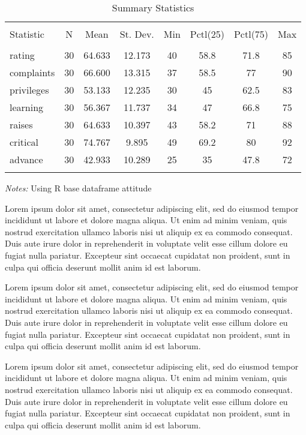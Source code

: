 \documentclass[11pt]{article}
\begin{document}
\begin{table}[tp] 
    \caption{Summary Statistics}
    \label{summ_stat}
    \centering 

    \begin{tabular}{lccccccc} 
        \hline 
        \hline \\[-1.8ex] 
        Statistic & N & Mean & St. Dev. & Min & Pctl(25) & Pctl(75) & Max\\ 
        \hline \\[-1.8ex] 
        rating & 30 & 64.633 & 12.173 & 40 & 58.8 & 71.8 & 85 \\ 
        complaints & 30 & 66.600 & 13.315 & 37 & 58.5 & 77 & 90 \\ 
        privileges & 30 & 53.133 & 12.235 & 30 & 45 & 62.5 & 83 \\ 
        learning & 30 & 56.367 & 11.737 & 34 & 47 & 66.8 & 75 \\ 
        raises & 30 & 64.633 & 10.397 & 43 & 58.2 & 71 & 88 \\ 
        critical & 30 & 74.767 & 9.895 & 49 & 69.2 & 80 & 92 \\ 
        advance & 30 & 42.933 & 10.289 & 25 & 35 & 47.8 & 72 \\ 
        \hline \\[-1.8ex] 
    \end{tabular} 
    
    \textit{Notes:} Using R base dataframe attitude \\ 
\end{table} 

Lorem ipsum dolor sit amet, consectetur adipiscing elit, sed do eiusmod tempor incididunt ut labore et dolore magna aliqua. Ut enim ad minim veniam, quis nostrud exercitation ullamco laboris nisi ut aliquip ex ea commodo consequat. Duis aute irure dolor in reprehenderit in voluptate velit esse cillum dolore eu fugiat nulla pariatur. Excepteur sint occaecat cupidatat non proident, sunt in culpa qui officia deserunt mollit anim id est laborum. 

Lorem ipsum dolor sit amet, consectetur adipiscing elit, sed do eiusmod tempor incididunt ut labore et dolore magna aliqua. Ut enim ad minim veniam, quis nostrud exercitation ullamco laboris nisi ut aliquip ex ea commodo consequat. Duis aute irure dolor in reprehenderit in voluptate velit esse cillum dolore eu fugiat nulla pariatur. Excepteur sint occaecat cupidatat non proident, sunt in culpa qui officia deserunt mollit anim id est laborum.

Lorem ipsum dolor sit amet, consectetur adipiscing elit, sed do eiusmod tempor incididunt ut labore et dolore magna aliqua. Ut enim ad minim veniam, quis nostrud exercitation ullamco laboris nisi ut aliquip ex ea commodo consequat. Duis aute irure dolor in reprehenderit in voluptate velit esse cillum dolore eu fugiat nulla pariatur. Excepteur sint occaecat cupidatat non proident, sunt in culpa qui officia deserunt mollit anim id est laborum. 
\end{document}
